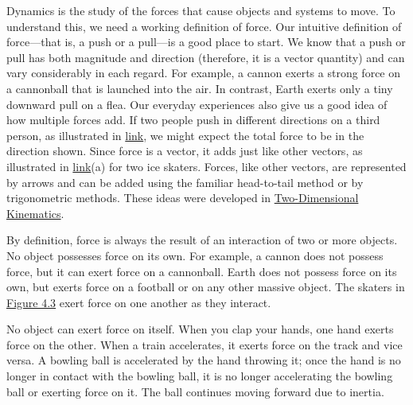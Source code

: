 \documentclass[
]{book}
\begin{document}
\protect\hypertarget{import-auto-id2134480}{}{Dynamics} is the study of the
forces that cause objects and systems to move. To understand this, we
need a working definition of force. Our intuitive definition of
\protect\hypertarget{import-auto-id2712510}{}{force}---that is, a push or a
pull---is a good place to start. We know that a push or pull has both
magnitude and direction (therefore, it is a vector quantity) and can
vary considerably in each regard. For example, a cannon exerts a strong
force on a cannonball that is launched into the air. In contrast, Earth
exerts only a tiny downward pull on a flea. Our everyday experiences
also give us a good idea of how multiple forces add. If two people push
in different directions on a third person, as illustrated in
\protect\hyperlink{import-auto-id2379809}{link}, we might expect
the total force to be in the direction shown. Since force is a vector,
it adds just like other vectors, as illustrated in
\protect\hyperlink{import-auto-id2379809}{link}(a) for two ice
skaters. Forces, like other vectors, are represented by arrows and can
be added using the familiar head-to-tail method or by trigonometric
methods. These ideas were developed in \href{/m54779}{Two-Dimensional
Kinematics}.

By definition, force is always the result of an interaction of two or
more objects. No object possesses force on its own. For example, a
cannon does not possess force, but it can exert force on a cannonball.
Earth does not possess force on its own, but exerts force on a football
or on any other massive object. The skaters in \protect\hyperlink{import-auto-id2379809}{Figure
4.3} exert force on one another as they
interact.

No object can exert force on itself. When you clap your hands, one hand
exerts force on the other. When a train accelerates, it exerts force on
the track and vice versa. A bowling ball is accelerated by the hand
throwing it; once the hand is no longer in contact with the bowling
ball, it is no longer accelerating the bowling ball or exerting force on
it. The ball continues moving forward due to inertia.
\end{document}
